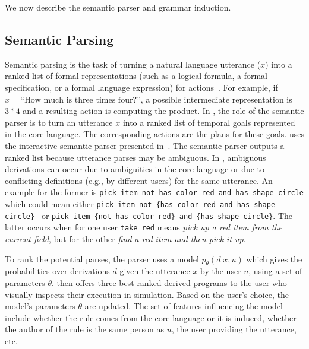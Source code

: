 We now describe the semantic parser and grammar induction.
%


\subsection{Semantic Parsing}
Semantic parsing
is the task of turning a natural language utterance ($x$) into a
ranked list of formal representations (such as a logical formula, a formal specification, or a
formal language expression) for actions~\cite{liangSemanticParsers}.
For example, if $x = \text{``How much is three times four?''}$,
a possible intermediate representation is $3*4$ and a
resulting action is computing the product.
In \tool, the role of the semantic parser is to turn an utterance $x$
into a ranked list of temporal goals represented in the core language.
The corresponding actions are the plans for these goals.
\tool uses the interactive semantic parser presented in~\cite{wangVoxelurn}.
The semantic parser outputs a ranked list because utterance parses may be ambiguous.
In \tool, ambiguous derivations can occur
due to ambiguities in the core language
or due to conflicting definitions (e.g., by different users) for the same utterance.
An example for the former is \lstinline{pick item not has color red and has shape circle}
which could mean either
\lstinline |pick item not {has color red and has shape circle} | or \lstinline |pick item {not has color red} and {has shape circle}|.
The latter occurs when for one user
\lstinline{take red} means \textit{pick up a red item from the
current field}, but for the other \textit{find a red item and then pick it up}.

To rank the potential parses, the parser uses a model $p_\theta(d | x, u)$
which gives the probabilities over derivations $d$ given the utterance $x$ by the user $u$,
using a set of parameters $\theta$.
\tool then offers three best-ranked derived programs to the user who
visually inspects their execution in simulation.
Based on the user's choice, the model's parameters $\theta$ are updated.
The set of features influencing the
model include whether the rule comes from the core language or it is induced,
whether the author of the rule is the same person as $u$, the user providing the
utterance, etc.

